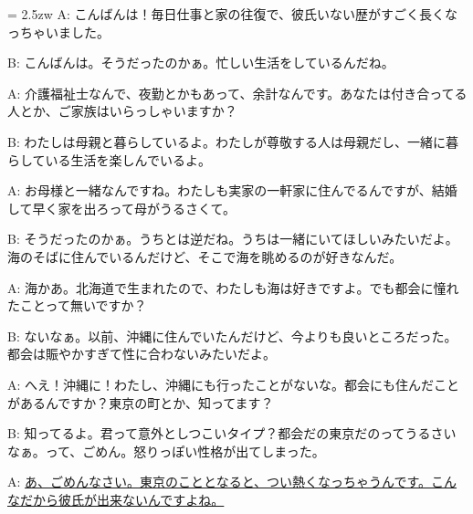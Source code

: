 \documentclass[11pt]{amsart}
\title{}
\author{}
\newenvironment{hangall}[1]{\hangindent = 2.5zw\everypar{\hangindent = 2.5zw}}{}
\begin{document}
\maketitle
\begin{hangall}{}%
A: こんばんは！毎日仕事と家の往復で、彼氏いない歴がすごく長くなっちゃいました。

B: こんばんは。そうだったのかぁ。忙しい生活をしているんだね。

A: 介護福祉士なんで、夜勤とかもあって、余計なんです。あなたは付き合ってる人とか、ご家族はいらっしゃいますか？

B: わたしは母親と暮らしているよ。わたしが尊敬する人は母親だし、一緒に暮らしている生活を楽しんでいるよ。

A: お母様と一緒なんですね。わたしも実家の一軒家に住んでるんですが、結婚して早く家を出ろって母がうるさくて。

B: そうだったのかぁ。うちとは逆だね。うちは一緒にいてほしいみたいだよ。海のそばに住んでいるんだけど、そこで海を眺めるのが好きなんだ。

A: 海かあ。北海道で生まれたので、わたしも海は好きですよ。でも都会に憧れたことって無いですか？

B: ないなぁ。以前、沖縄に住んでいたんだけど、今よりも良いところだった。都会は賑やかすぎて性に合わないみたいだよ。

A: へえ！沖縄に！わたし、沖縄にも行ったことがないな。都会にも住んだことがあるんですか？東京の町とか、知ってます？

B: 知ってるよ。君って意外としつこいタイプ？都会だの東京だのってうるさいなぁ。って、ごめん。怒りっぽい性格が出てしまった。

A: \ul{あ、ごめんなさい。東京のこととなると、つい熱くなっちゃうんです。こんなだから彼氏が出来ないんですよね。}\end{hangall}
\end{document}
